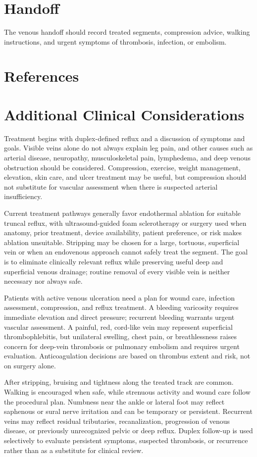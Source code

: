 \section*{Handoff}
The venous handoff should record treated segments, compression advice, walking instructions, and urgent symptoms of thrombosis, infection, or embolism.

\section*{References}

\section*{Additional Clinical Considerations}
Treatment begins with duplex-defined reflux and a discussion of symptoms and goals. Visible veins alone do not always explain leg pain, and other causes such as arterial disease, neuropathy, musculoskeletal pain, lymphedema, and deep venous obstruction should be considered. Compression, exercise, weight management, elevation, skin care, and ulcer treatment may be useful, but compression should not substitute for vascular assessment when there is suspected arterial insufficiency.

Current treatment pathways generally favor endothermal ablation for suitable truncal reflux, with ultrasound-guided foam sclerotherapy or surgery used when anatomy, prior treatment, device availability, patient preference, or risk makes ablation unsuitable. Stripping may be chosen for a large, tortuous, superficial vein or when an endovenous approach cannot safely treat the segment. The goal is to eliminate clinically relevant reflux while preserving useful deep and superficial venous drainage; routine removal of every visible vein is neither necessary nor always safe.

Patients with active venous ulceration need a plan for wound care, infection assessment, compression, and reflux treatment. A bleeding varicosity requires immediate elevation and direct pressure; recurrent bleeding warrants urgent vascular assessment. A painful, red, cord-like vein may represent superficial thrombophlebitis, but unilateral swelling, chest pain, or breathlessness raises concern for deep-vein thrombosis or pulmonary embolism and requires urgent evaluation. Anticoagulation decisions are based on thrombus extent and risk, not on surgery alone.

After stripping, bruising and tightness along the treated track are common. Walking is encouraged when safe, while strenuous activity and wound care follow the procedural plan. Numbness near the ankle or lateral foot may reflect saphenous or sural nerve irritation and can be temporary or persistent. Recurrent veins may reflect residual tributaries, recanalization, progression of venous disease, or previously unrecognized pelvic or deep reflux. Duplex follow-up is used selectively to evaluate persistent symptoms, suspected thrombosis, or recurrence rather than as a substitute for clinical review.

